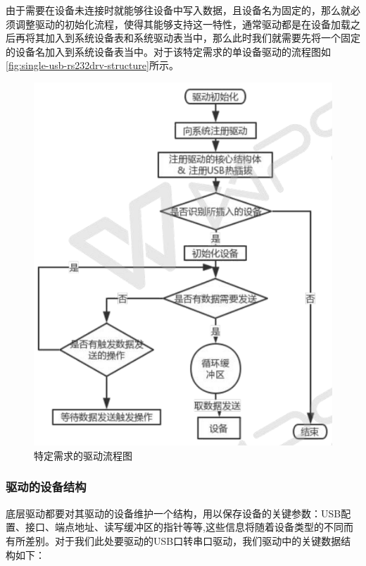 	由于需要在设备未连接时就能够往设备中写入数据，且设备名为固定的，那么就必须调整驱动的初始化流程，使得其能够支持这一特性，通常驱动都是在设备加载之后再将其加入到系统设备表和系统驱动表当中，那么此时我们就需要先将一个固定的设备名加入到系统设备表当中。对于该特定需求的单设备驱动的流程图如\autoref{fig:single-usb-rs232drv-structure}所示。
\begin{figure}[!ht]
\centering
\includegraphics[width=.7\textwidth]{./graphics/sDevDrv.pdf}
\caption{特定需求的驱动流程图}\label{fig:single-usb-rs232drv-structure}
\end{figure}


\subsubsection{驱动的设备结构}
	底层驱动都要对其驱动的设备维护一个结构，用以保存设备的关键参数：USB配置、接口、端点地址、读写缓冲区的指针等等,这些信息将随着设备类型的不同而有所差别。对于我们此处要驱动的USB口转串口驱动，我们驱动中的关键数据结构如下： 
	
